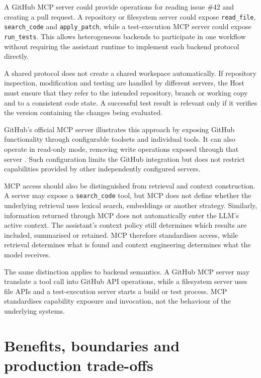 A GitHub MCP server could provide operations for reading issue \#42 and creating a pull request. A repository or filesystem server could expose \texttt{read\_file}, \texttt{search\_code} and \texttt{apply\_patch}, while a test-execution MCP server could expose \texttt{run\_tests}. This allows heterogeneous backends to participate in one workflow without requiring the assistant runtime to implement each backend protocol directly.

A shared protocol does not create a shared workspace automatically. If repository inspection, modification and testing are handled by different servers, the Host must ensure that they refer to the intended repository, branch or working copy and to a consistent code state. A successful test result is relevant only if it verifies the version containing the changes being evaluated.

GitHub's official MCP server illustrates this approach by exposing GitHub functionality through configurable toolsets and individual tools. It can also operate in read-only mode, removing write operations exposed through that server \parencite{github-mcp-configuration}. Such configuration limits the GitHub integration but does not restrict capabilities provided by other independently configured servers.

MCP access should also be distinguished from retrieval and context construction. A server may expose a \texttt{search\_code} tool, but MCP does not define whether the underlying retrieval uses lexical search, embeddings or another strategy. Similarly, information returned through MCP does not automatically enter the LLM's active context. The assistant's context policy still determines which results are included, summarised or retained. MCP therefore standardises access, while retrieval determines what is found and context engineering determines what the model receives.

The same distinction applies to backend semantics. A GitHub MCP server may translate a tool call into GitHub API operations, while a filesystem server uses file APIs and a test-execution server starts a build or test process. MCP standardises capability exposure and invocation, not the behaviour of the underlying systems.

\section{Benefits, boundaries and production trade-offs}
\label{sec:mcp-tradeoffs}


